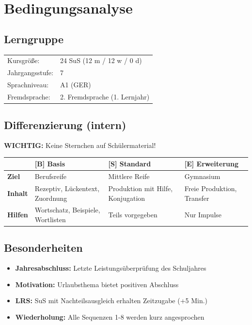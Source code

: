 \documentclass[11pt,a4paper]{article}
\newcommand{\jahrgangsstufe}{7}
\newcommand{\lerngruppengroesse}{24}
\newcommand{\maennlich}{12}
\newcommand{\weiblich}{12}
\newcommand{\divers}{0}
\newcommand{\gerniveau}{A1}
\begin{document}
\section{Bedingungsanalyse}

\subsection{Lerngruppe}
\begin{tabular}{ll}
    Kursgröße: & \lerngruppengroesse{} SuS (\maennlich{} m / \weiblich{} w / \divers{} d) \\
    Jahrgangsstufe: & \jahrgangsstufe \\
    Sprachniveau: & \gerniveau{} (GER) \\
    Fremdsprache: & 2. Fremdsprache (1. Lernjahr) \\
\end{tabular}

\subsection{Differenzierung (intern)}

\textbf{WICHTIG:} Keine Sternchen auf Schülermaterial!

\begin{tabular}{|l|p{4cm}|p{4cm}|p{4cm}|}
\hline
& \textbf{[B] Basis} & \textbf{[S] Standard} & \textbf{[E] Erweiterung} \\
\hline
\textbf{Ziel} & Berufsreife & Mittlere Reife & Gymnasium \\
\hline
\textbf{Inhalt} & Rezeptiv, Lückentext, Zuordnung & Produktion mit Hilfe, Konjugation & Freie Produktion, Transfer \\
\hline
\textbf{Hilfen} & Wortschatz, Beispiele, Wortlisten & Teils vorgegeben & Nur Impulse \\
\hline
\end{tabular}

\subsection{Besonderheiten}
\begin{itemize}
    \item \textbf{Jahresabschluss:} Letzte Leistungsüberprüfung des Schuljahres
    \item \textbf{Motivation:} Urlaubsthema bietet positiven Abschluss
    \item \textbf{LRS:} SuS mit Nachteilsausgleich erhalten Zeitzugabe (+5 Min.)
    \item \textbf{Wiederholung:} Alle Sequenzen 1-8 werden kurz angesprochen
\end{itemize}
\end{document}

